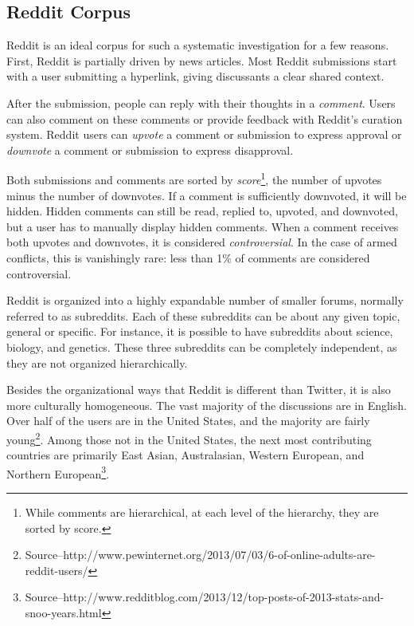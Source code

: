 \subsection{Reddit Corpus}
Reddit is an ideal corpus for such a systematic investigation for a few reasons. First, Reddit is partially driven by news articles. Most Reddit submissions start with a user submitting a hyperlink, giving discussants a clear shared context.

After the submission, people can reply with their thoughts in a \textit{comment}. Users can also comment on these comments or provide feedback with Reddit's curation system. Reddit users can \textit{upvote} a comment or submission to express approval or \textit{downvote} a comment or submission to express disapproval.

Both submissions and comments are sorted by \textit{score}\footnote{While comments are hierarchical, at each level of the hierarchy, they are sorted by score.}, the number of upvotes minus the number of downvotes. If a comment is sufficiently downvoted, it will be hidden. Hidden comments can still be read, replied to, upvoted, and downvoted, but a user has to manually display hidden comments. When a comment receives both upvotes and downvotes, it is considered \textit{controversial}. In the case of armed conflicts, this is vanishingly rare: less than 1\% of comments are considered controversial.  

Reddit is organized into a highly expandable number of smaller forums, normally referred to as subreddits. Each of these subreddits can be about any given topic, general or specific. For instance, it is possible to have subreddits about science, biology, and genetics. These three subreddits can be completely independent, as they are not organized hierarchically.

Besides the organizational ways that Reddit is different than Twitter, it is also more culturally homogeneous. The vast majority of the discussions are in English. Over half of the users are in the United States, and the majority are fairly young\footnote{Source--http://www.pewinternet.org/2013/07/03/6-of-online-adults-are-reddit-users/}. Among those not in the United States, the next most contributing countries are primarily East Asian, Australasian, Western European, and Northern European\footnote{Source--http://www.redditblog.com/2013/12/top-posts-of-2013-stats-and-snoo-years.html}. 


